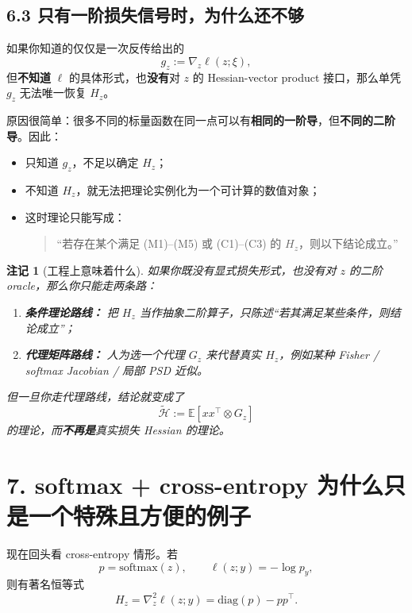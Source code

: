 \documentclass[11pt]{ctexart}
\newtheorem{remark}{注记}
\begin{document}
\subsection*{6.3 只有一阶损失信号时，为什么还不够}

如果你知道的仅仅是一次反传给出的
\[
g_z := \nabla_z \ell(z;\xi),
\]
但\textbf{不知道} $\ell$ 的具体形式，也\textbf{没有}对 $z$ 的 Hessian-vector product 接口，那么单凭 $g_z$ 无法唯一恢复 $H_z$。

原因很简单：很多不同的标量函数在同一点可以有\textbf{相同的一阶导}，但\textbf{不同的二阶导}。因此：

\begin{itemize}
    \item 只知道 $g_z$，不足以确定 $H_z$；
    \item 不知道 $H_z$，就无法把理论实例化为一个可计算的数值对象；
    \item 这时理论只能写成：
    \begin{quote}
    “若存在某个满足 (M1)--(M5) 或 (C1)--(C3) 的 $H_z$，则以下结论成立。”
    \end{quote}
\end{itemize}

\begin{remark}[工程上意味着什么]
如果你既没有显式损失形式，也没有对 $z$ 的二阶 oracle，那么你只能走两条路：

\begin{enumerate}[label=\arabic*.]
    \item \textbf{条件理论路线：} 把 $H_z$ 当作抽象二阶算子，只陈述“若其满足某些条件，则结论成立”；
    \item \textbf{代理矩阵路线：} 人为选一个代理 $G_z$ 来代替真实 $H_z$，例如某种 Fisher / softmax Jacobian / 局部 PSD 近似。
\end{enumerate}

但一旦你走代理路线，结论就变成了
\[
\widetilde{\mathcal{H}} := \mathbb{E}[xx^\top \otimes G_z]
\]
的理论，而\textbf{不再是}真实损失 Hessian 的理论。
\end{remark}

\section*{7. softmax + cross-entropy 为什么只是一个特殊且方便的例子}

现在回头看 cross-entropy 情形。若
\[
p = \mathrm{softmax}(z),
\qquad
\ell(z;y) = -\log p_y,
\]
则有著名恒等式
\[
H_z = \nabla_z^2 \ell(z;y) = \mathrm{diag}(p) - pp^\top.
\]
\end{document}
